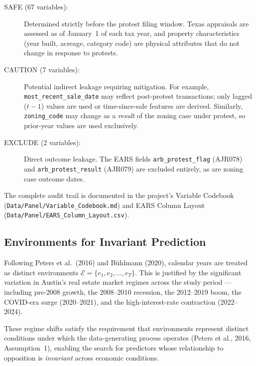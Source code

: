 \begin{description}
    \item[SAFE (67 variables):] Determined strictly before the protest filing window.
    Texas appraisals are assessed as of January~1 of each tax year,
    and property characteristics (year built, acreage, category code) are physical
    attributes that do not change in response to protests.

    \item[CAUTION (7 variables):] Potential indirect leakage requiring mitigation.
    For example, \texttt{most\_recent\_sale\_date} may reflect post-protest transactions;
    only lagged ($t-1$) values are used or time-since-sale features are derived.
    Similarly, \texttt{zoning\_code} may change as a \textit{result} of the zoning case
    under protest, so prior-year values are used exclusively.

    \item[EXCLUDE (2 variables):] Direct outcome leakage.
    The EARS fields \texttt{arb\_protest\_flag} (AJR078) and \texttt{arb\_protest\_result} (AJR079)
    are excluded entirely, as are zoning case outcome dates.
\end{description}

\noindent
The complete audit trail is documented in the project's Variable Codebook
(\texttt{Data/Panel/Variable\_Codebook.md}) and EARS Column Layout
(\texttt{Data/Panel/EARS\_Column\_Layout.csv}).

\subsection{Environments for Invariant Prediction}

Following Peters et al.\ (2016) and Bühlmann (2020), calendar years are treated as
distinct environments $\mathcal{E} = \{e_1, e_2, \ldots, e_T\}$.
This is justified by the significant variation in Austin's real estate market regimes
across the study period --- including pre-2008 growth, the 2008--2010 recession,
the 2012--2019 boom, the COVID-era surge (2020--2021),
and the high-interest-rate contraction (2022--2024).

These regime shifts satisfy the requirement that environments represent
distinct conditions under which the data-generating process operates
(Peters et al., 2016, Assumption~1),
enabling the search for predictors whose relationship to opposition
is \textit{invariant} across economic conditions.
